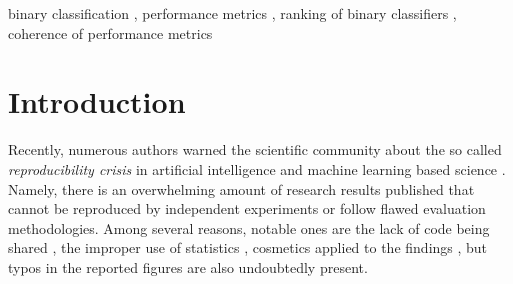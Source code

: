 \documentclass[5p, final]{elsarticle}
\begin{document}
\begin{frontmatter}
\begin{abstract}
\end{abstract}

\begin{keyword}
binary classification
\sep 
performance metrics
\sep
ranking of binary classifiers
\sep 
coherence of performance metrics
\end{keyword}


\end{frontmatter}

        


\section{Introduction}\label{section:Introduction}

Recently, numerous authors warned the scientific community about the so called \emph{reproducibility crisis} in artificial intelligence and machine learning based science \cite{leakage, reprcrisis, repr0, repr1}. Namely, there is an overwhelming amount of research results published that cannot be reproduced by independent experiments or follow flawed evaluation methodologies. Among several reasons, notable ones are the lack of code being shared \cite{leakage}, the improper use of statistics \cite{leakage, staterrors}, cosmetics applied to the findings \cite{fabrication}, but typos in the reported figures are also undoubtedly present.
\end{document}
